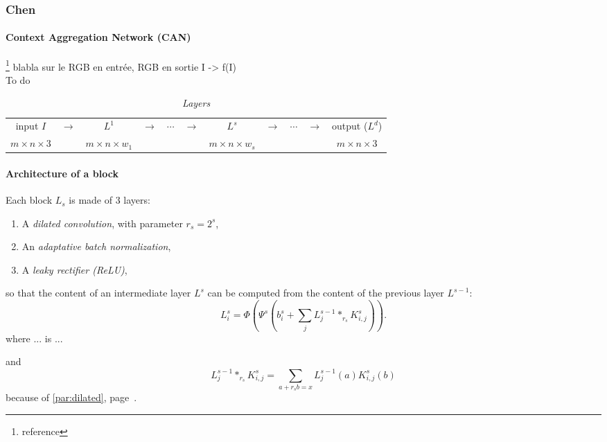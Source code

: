 \documentclass{article}
\begin{document}
        \newpage
        \subsubsection{Chen}
            \paragraph{Context Aggregation Network (CAN)}\footnote{reference}
            blabla sur le RGB en entrée, RGB en sortie I -> f(I)\\
            To do
            \begin{table}[!ht]
                \center
                \begin{tabular}{ccccccccccc}
                    \hline
                    input $I$ & $\longrightarrow$ & $L^1$ & $\longrightarrow$ & $\cdots$ & $\longrightarrow$ & $L^s$ & $\longrightarrow$ & $\cdots$ & $\longrightarrow$ & output ($L^d$)\\
                    $m\times n\times 3$ & & $m\times n\times w_1$ & & & & $m\times n\times w_s$ & & & & $m\times n\times 3$\\
                    \hline
                \end{tabular}
                \caption{\textit{Layers}}
            \end{table}

            \paragraph{Architecture of a block}
            Each block $L_s$ is made of 3 layers:
            \begin{enumerate}
                \item A \textit{dilated convolution}, with parameter $r_s=2^s$,
                \item An \textit{adaptative batch normalization},
                \item A \textit{leaky rectifier (ReLU)},
            \end{enumerate}
            so that the content of an intermediate layer $L^s$ can be computed from the content of the previous layer $L^{s-1}$:
            \begin{equation}
                L_i^s=\Phi\left(\Psi^s\left(b_i^s+\sum_jL_j^{s-1}*_{r_s}K^s_{i,j}\right)\right).
            \end{equation}
            where ... is ...

            and
            \begin{equation}
                L_j^{s-1}*_{r_s}K^s_{i,j}=\sum_{a+r_sb=x}L_j^{s-1}(a)K_{i,j}^s(b)
            \end{equation}
            because of \ref{par:dilated}, page~\pageref{par:dilated}.
\end{document}
